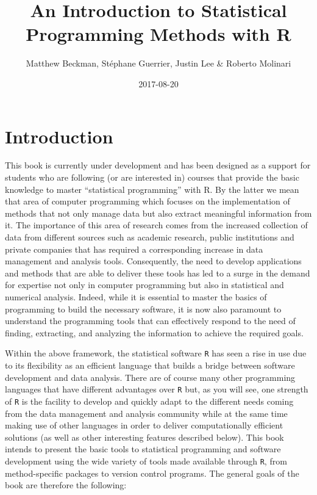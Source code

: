 \documentclass[]{book}
\title{An Introduction to Statistical Programming Methods with R}
\author{Matthew Beckman, Stéphane Guerrier, Justin Lee \& Roberto Molinari}
\date{2017-08-20}
\theoremstyle{definition}
\theoremstyle{definition}
\theoremstyle{remark}
\begin{document}
\maketitle

{
\setcounter{tocdepth}{1}
\tableofcontents
}
\chapter{Introduction}\label{introduction}

This book is currently under development and has been designed as a
support for students who are following (or are interested in) courses
that provide the basic knowledge to master ``statistical programming''
with R. By the latter we mean that area of computer programming which
focuses on the implementation of methods that not only manage data but
also extract meaningful information from it. The importance of this area
of research comes from the increased collection of data from different
sources such as academic research, public institutions and private
companies that has required a corresponding increase in data management
and analysis tools. Consequently, the need to develop applications and
methods that are able to deliver these tools has led to a surge in the
demand for expertise not only in computer programming but also in
statistical and numerical analysis. Indeed, while it is essential to
master the basics of programming to build the necessary software, it is
now also paramount to understand the programming tools that can
effectively respond to the need of finding, extracting, and analyzing
the information to achieve the required goals.

Within the above framework, the statistical software \texttt{R} has seen
a rise in use due to its flexibility as an efficient language that
builds a bridge between software development and data analysis. There
are of course many other programming languages that have different
advantages over \texttt{R} but, as you will see, one strength of
\texttt{R} is the facility to develop and quickly adapt to the different
needs coming from the data management and analysis community while at
the same time making use of other languages in order to deliver
computationally efficient solutions (as well as other interesting
features described below). This book intends to present the basic tools
to statistical programming and software development using the wide
variety of tools made available through \texttt{R}, from method-specific
packages to version control programs. The general goals of the book are
therefore the following:
\end{document}
